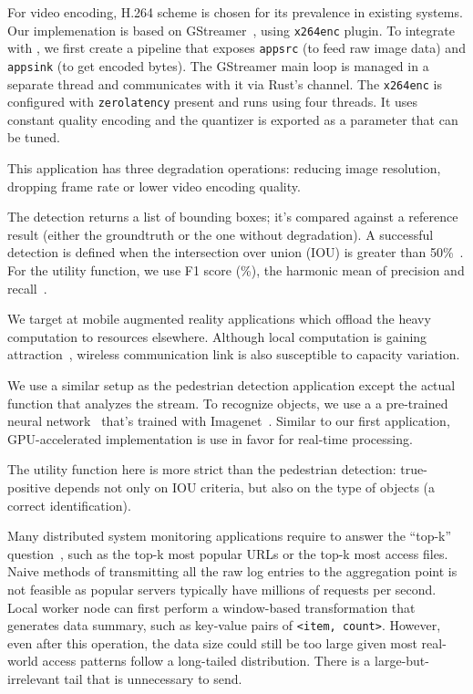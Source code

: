 For video encoding, H.264 scheme is chosen for its prevalence in existing
systems. Our implemenation is based on GStreamer~\cite{gstreamer}, using
\texttt{x264enc} plugin. To integrate with \sysname{}, we first create a
pipeline that exposes \texttt{appsrc} (to feed raw image data) and
\texttt{appsink} (to get encoded bytes). The GStreamer main loop is managed in a
separate thread and \sysname{} communicates with it via Rust's channel. The
\texttt{x264enc} is configured with \texttt{zerolatency} present and runs using
four threads. It uses constant quality encoding and the quantizer is exported as
a parameter that can be tuned.

This application has three degradation operations: reducing image resolution,
dropping frame rate or lower video encoding quality.

The detection returns a list of bounding boxes; it's compared against a
reference result (either the groundtruth or the one without degradation). A
successful detection is defined when the intersection over union (IOU) is
greater than 50\%~\cite{everingham2010pascal}. For the utility function, we use
F1 score (\%), the harmonic mean of precision and
recall~\cite{Rijsbergen:1979:IR:539927}.

 We target at mobile augmented reality applications
which offload the heavy computation to resources elsewhere. Although local
computation is gaining attraction~\cite{satyanarayanan2009case, zhang2015cloud},
wireless communication link is also susceptible to capacity variation.

We use a similar setup as the pedestrian detection application except the actual
function that analyzes the stream. To recognize objects, we use a a pre-trained
neural network~\cite{darknet13} that's trained with
Imagenet~\cite{krizhevsky2012imagenet}. Similar to our first application,
GPU-accelerated implementation is use in favor for real-time processing.

The utility function here is more strict than the pedestrian detection:
true-positive depends not only on IOU criteria, but also on the type of objects
(a correct identification).

 Many distributed system monitoring applications
require to answer the ``top-k'' question~\cite{babcock2003distributed}, such as
the top-k most popular URLs or the top-k most access files. Naive methods of
transmitting all the raw log entries to the aggregation point is not feasible as
popular servers typically have millions of requests per second. Local worker
node can first perform a window-based transformation that generates data
summary, such as key-value pairs of \texttt{<item, count>}. However, even after
this operation, the data size could still be too large given most real-world
access patterns follow a long-tailed distribution. There is a
large-but-irrelevant tail that is unnecessary to send.

